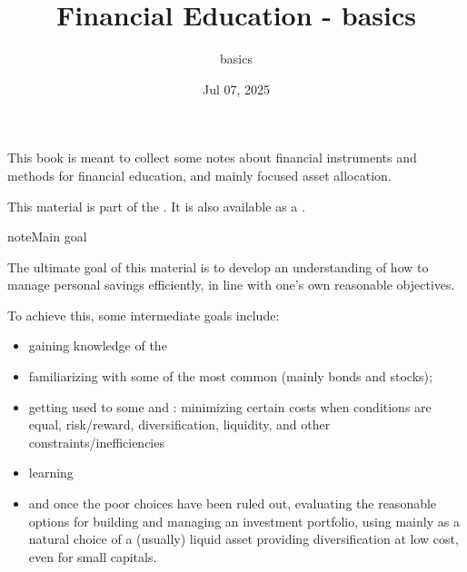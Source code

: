\documentclass[letterpaper,10pt,english]{jupyterBook}
\title{Financial Education - basics}
\date{Jul 07, 2025}
\author{basics}
\begin{document}
\pagestyle{empty}
\sphinxmaketitle
\pagestyle{plain}
\sphinxtableofcontents
\pagestyle{normal}
\label{\detokenize{intro::doc}}


\sphinxAtStartPar
This book is meant to collect some notes about financial instruments and methods for financial education, and mainly focused asset allocation.

\sphinxAtStartPar
This material is part of the . It is also available as a .

\begin{sphinxadmonition}{note}{Main goal}

\sphinxAtStartPar
The ultimate goal of this material is to develop an understanding of how to manage personal savings efficiently, in line with one’s own reasonable objectives.

\sphinxAtStartPar
To achieve this, some intermediate goals include:
\begin{itemize}
\item {} 
\sphinxAtStartPar
gaining knowledge of the 

\item {} 
\sphinxAtStartPar
familiarizing with some of the most common  (mainly bonds and stocks);

\item {} 
\sphinxAtStartPar
getting used to some  and : minimizing certain costs when conditions are equal, risk/reward, diversification, liquidity, and other constraints/inefficiencies

\item {} 
\sphinxAtStartPar
learning 

\item {} 
\sphinxAtStartPar
and once the poor choices have been ruled out, evaluating the reasonable options for building and managing an investment portfolio, using mainly {\hyperref[\detokenize{ch/assets/etfs:fin-edu-assets-etfs}]{}} as a natural choice of a (usually) liquid asset providing diversification at low cost, even for small capitals.

\end{itemize}
\end{sphinxadmonition}
\end{document}

